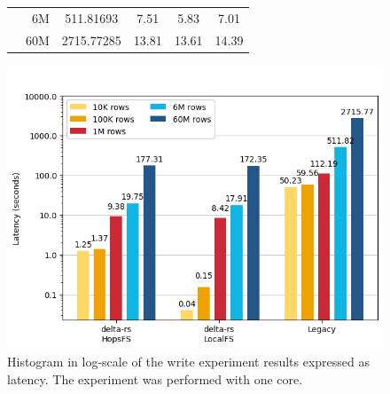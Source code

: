 \begin{figure}
\begin{minipage}[b]{\textwidth}
\begin{tabular}{c r S[table-format=4.5] S[table-format=2.2] S[table-format=2.2] S[table-format=2.2]}
            & 6M &   511.81693 & 7.51 & 5.83 & 7.01\\
            & 60M &  2715.77285 & 13.81 & 13.61 & 14.39\\
            \bottomrule
        \end{tabular}
    \end{minipage}
    \begin{minipage}[b]{\textwidth}
        \centering
        \includegraphics[width=\textwidth]{figures/5-results/write/write_time_1_core.png}
        \caption[Histogram of the write experiment - Latency - 1 CPU core]{Histogram in log-scale of the write experiment results expressed as latency. The experiment was performed with one  core.}
        \label{fig:res_write_time}
    \end{minipage}
\end{figure}

